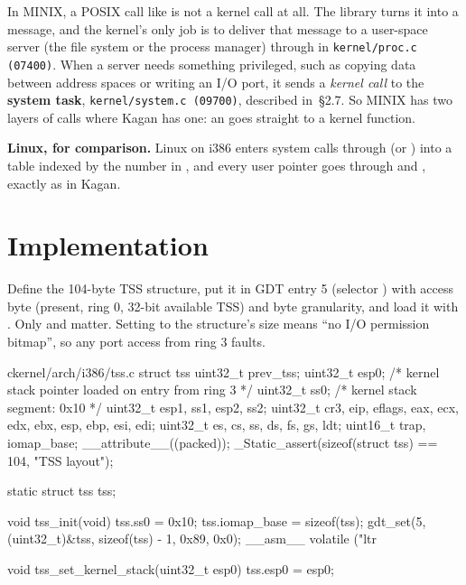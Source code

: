 \documentclass[11pt,a4paper]{article}
\begin{document}
\begin{minixbox}
In MINIX, a POSIX call like  is not a kernel call at all. The library turns it into a message, and the
kernel's only job is to deliver that message to a user-space server (the file system or the process manager) through
 in \texttt{kernel/proc.c (07400)}. When a server needs something privileged, such as copying data
between address spaces or writing an I/O port, it sends a \emph{kernel call} to the \textbf{system task},
\texttt{kernel/system.c (09700)}, described in \OSDI\,\S2.7. So MINIX has two layers of calls where Kagan has one:
an  goes straight to a kernel function.

\par\smallskip\textbf{Linux, for comparison.} \LKD Linux on i386 enters system calls through  (or ) into a table indexed by the number in , and every user pointer goes through  and , exactly as in Kagan.
\end{minixbox}

\section{Implementation}

Define the 104-byte TSS structure, put it in GDT entry 5 (selector ) with access byte  (present,
ring 0, 32-bit available TSS) and byte granularity, and load it with . Only  and 
matter. Setting  to the structure's size means ``no I/O permission bitmap'', so any port access from
ring 3 faults.

\begin{lst}{c}{kernel/arch/i386/tss.c}
struct tss {
    uint32_t prev_tss;
    uint32_t esp0;              /* kernel stack pointer loaded on entry from ring 3 */
    uint32_t ss0;               /* kernel stack segment: 0x10                       */
    uint32_t esp1, ss1, esp2, ss2;
    uint32_t cr3, eip, eflags, eax, ecx, edx, ebx, esp, ebp, esi, edi;
    uint32_t es, cs, ss, ds, fs, gs, ldt;
    uint16_t trap, iomap_base;
} __attribute__((packed));
_Static_assert(sizeof(struct tss) == 104, "TSS layout");

static struct tss tss;

void tss_init(void)
{
    tss.ss0 = 0x10;
    tss.iomap_base = sizeof(tss);
    gdt_set(5, (uint32_t)&tss, sizeof(tss) - 1, 0x89, 0x0);
    __asm__ volatile ("ltr %
}

void tss_set_kernel_stack(uint32_t esp0) { tss.esp0 = esp0; }
\end{lst}
\end{document}
